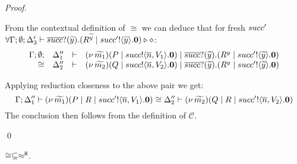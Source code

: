 \begin{proof}
\begin{itemize}
\begin{itemize}
							From the contextual definition of $\cong$ we can deduce that for fresh $succ'$
							$\forall \Gamma; \emptyset; \Delta_3' \vdash \overline{succ} ? (\widetilde{y}) . (R^{\widetilde{y}} \;|\; succ' ! \langle \widetilde{y} \rangle . \mathbf{0}) \triangleright \diamond$:
							\[
								\begin{array}{rcll} \Gamma; \emptyset; &\Delta_1''& \vdash& (\nu\, \widetilde{m_1})(P \;|\; succ ! \langle \overline{n}, V_1 \rangle . \mathbf{0})
									\;|\; \overline{succ} ? (\widetilde{y}) . (R^{y} \;|\; succ' ! \langle \widetilde{y} \rangle . \mathbf{0})\\ \cong &\Delta_2''& \vdash &  (\nu\, \widetilde{m_2})(Q \;|\; succ ! \langle \overline{n}, V_2 \rangle . \mathbf{0})
									\;|\; \overline{succ} ? (\widetilde{y}) . (R^{y} \;|\; succ' ! \langle \widetilde{y} \rangle . \mathbf{0}) \end{array}
							\]

							\noi Applying reduction closeness to the above pair we get:
							\[
								\Gamma; \Delta_1'' \vdash (\nu\, \widetilde{m_1})(P \;|\; R \;|\; succ' ! \langle \overline{n}, V_1 \rangle . \mathbf{0}) \cong \Delta_2'' \vdash (\nu\, \widetilde{m_2})(Q \;|\; R \;|\; succ' ! \langle \overline{n}, V_2 \rangle . \mathbf{0})
							\]
						\noi The conclusion then follows from the definition of $\mathcal{C}$.
	    \end{itemize}
	\end{itemize}
	\qed
\end{proof}


\begin{lemma}\rm
	\label{app:lem:cong_is_wb}
	$\cong \subseteq \approx^\mathtt{H}$.
\end{lemma}

